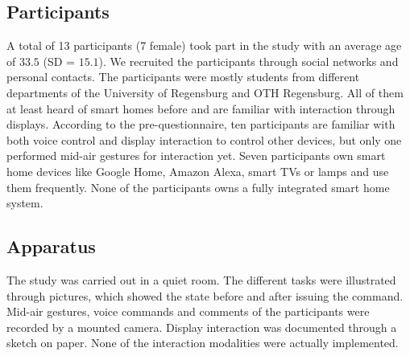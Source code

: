 \documentclass[sigchi]{acmart}
\begin{document}
	\subsection{Participants}
	A total of 13 participants (7 female) took part in the study with an average age of $33.5$ (SD = $15.1$). We recruited the participants through social networks and personal contacts. The participants were mostly students from different departments of the University of Regensburg and OTH Regensburg. All of them at least heard of smart homes before and are familiar with interaction through displays. According to the pre-questionnaire, ten participants are familiar with both voice control and display interaction to control other devices, but only one performed mid-air gestures for interaction yet. Seven participants own smart home devices like Google Home, Amazon Alexa, smart TVs or lamps and use them frequently. None of the participants owns a fully integrated smart home system.
	
	\subsection{Apparatus}
	The study was carried out in a quiet room. The different tasks were illustrated through pictures, which showed the state before and after issuing the command. Mid-air gestures, voice commands and comments of the participants were recorded by a mounted camera. Display interaction was documented through a sketch on paper. None of the interaction modalities were actually implemented.
	
\end{document}
